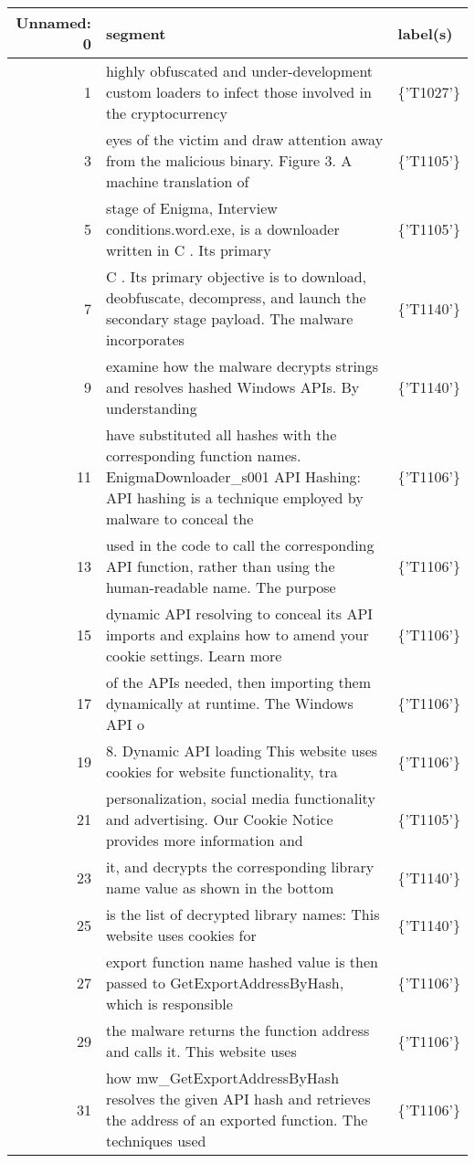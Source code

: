 \begin{tabular}{rll}
\toprule
Unnamed: 0 & segment & label(s) \\
\midrule
1 & highly obfuscated and under-development custom loaders to infect those involved in the cryptocurrency & \{'T1027'\} \\
3 & eyes of the victim and draw attention away from the malicious binary. Figure 3. A machine translation of & \{'T1105'\} \\
5 & stage of Enigma, Interview conditions.word.exe, is a downloader written in C  . Its primary & \{'T1105'\} \\
7 & C  . Its primary objective is to download, deobfuscate, decompress, and launch the secondary stage payload. The malware incorporates & \{'T1140'\} \\
9 & examine how the malware decrypts strings and resolves hashed Windows APIs. By understanding & \{'T1140'\} \\
11 & have substituted all hashes with the corresponding function names. EnigmaDownloader\_s001 API Hashing: API hashing is a technique employed by malware to conceal the & \{'T1106'\} \\
13 & used in the code to call the corresponding API function, rather than using the human-readable name. The purpose & \{'T1106'\} \\
15 & dynamic API resolving to conceal its API imports and explains how to amend your cookie settings. Learn more & \{'T1106'\} \\
17 & of the APIs needed, then importing them dynamically at runtime. The Windows API o & \{'T1106'\} \\
19 & 8. Dynamic API loading This website uses cookies for website functionality, tra & \{'T1106'\} \\
21 & personalization, social media functionality and advertising. Our Cookie Notice provides more information and & \{'T1105'\} \\
23 & it, and decrypts the corresponding library name value as shown in the bottom & \{'T1140'\} \\
25 & is the list of decrypted library names:   This website uses cookies for & \{'T1140'\} \\
27 & export function name hashed value is then passed to GetExportAddressByHash, which is responsible & \{'T1106'\} \\
29 & the malware returns the function address and calls it.   This website uses & \{'T1106'\} \\
31 & how mw\_GetExportAddressByHash resolves the given API hash and retrieves the address of an exported function. The techniques used & \{'T1106'\} \\

\end{tabular}

